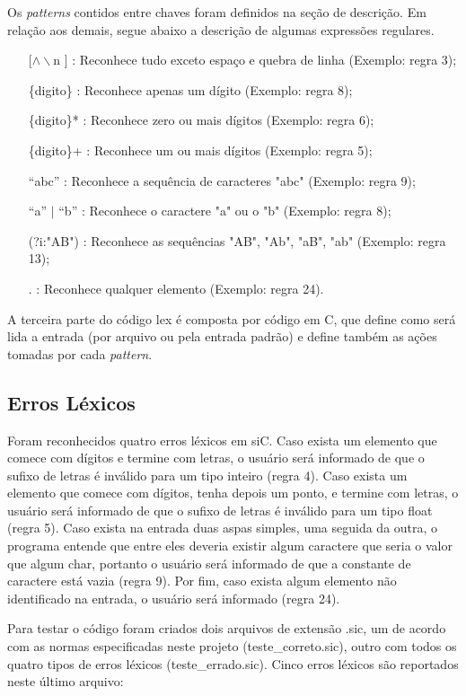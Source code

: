\documentclass[12pt]{article}
\begin{document}
\indent Os \textit{patterns} contidos entre chaves foram definidos na seção de descrição. Em relação aos demais, segue abaixo a descrição de algumas expressões regulares. 

\begin{itemize}
  \item[ [$\wedge\backslash$n] ] : Reconhece tudo exceto espaço e quebra de linha (Exemplo: regra 3);
  \item[\{digito\}] : Reconhece apenas um dígito (Exemplo: regra 8);
  \item[\{digito\}*] : Reconhece zero ou mais dígitos (Exemplo: regra 6);
  \item[\{digito\}+] : Reconhece um ou mais dígitos (Exemplo: regra 5);
  \item[``abc''] : Reconhece a sequência de caracteres "abc" (Exemplo: regra 9);
  \item[``a'' $\vert$ ``b''] : Reconhece o caractere "a" ou o "b" (Exemplo: regra 8);
  \item[(?i:"AB")] : Reconhece as sequências "AB", "Ab", "aB", "ab" (Exemplo: regra 13);
  \item[.] : Reconhece qualquer elemento (Exemplo: regra 24).
\end{itemize}

\indent A terceira parte do código lex é composta por código em C, que define como será lida a entrada (por arquivo ou pela entrada padrão) e define também as ações tomadas por cada \textit{pattern}.

\subsection{Erros Léxicos}

\indent Foram reconhecidos quatro erros léxicos em siC. Caso exista um elemento que comece com dígitos e termine com letras, o usuário será informado de que o sufixo de letras é inválido para um tipo inteiro (regra 4). Caso exista um elemento que comece com dígitos, tenha depois um ponto, e termine com letras, o usuário será informado de que o sufixo de letras é inválido para um tipo float (regra 5). Caso exista na entrada duas aspas simples, uma seguida da outra, o programa entende que entre eles deveria existir algum caractere que seria o valor que algum char, portanto o usuário será informado de que a constante de caractere está vazia (regra 9). Por fim, caso exista algum elemento não identificado na entrada, o usuário será informado (regra 24).

\indent Para testar o código foram criados dois arquivos de extensão .sic, um de acordo com as normas especificadas neste projeto (teste\_correto.sic), outro com todos os quatro tipos de erros léxicos (teste\_errado.sic). Cinco erros léxicos são reportados neste último arquivo:
\end{document}
